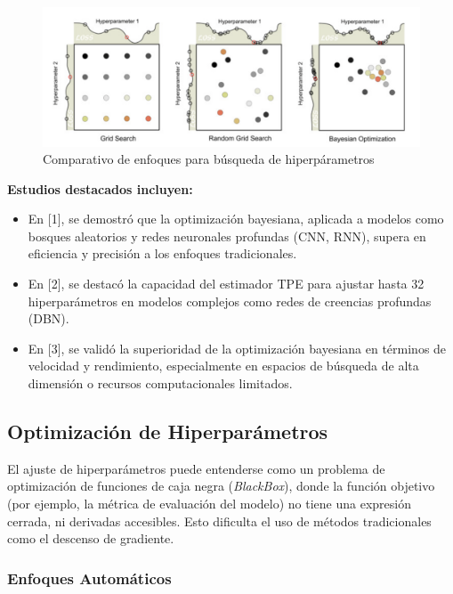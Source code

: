 \documentclass[
  12pt,
  letterpaper,
  DIV=11,
  numbers=noendperiod]{scrartcl}
\providecommand{\tightlist}{%
  \setlength{\itemsep}{0pt}\setlength{\parskip}{0pt}}\usepackage{longtable,booktabs,array}
\begin{document}
\begin{figure}[H]

{\centering \includegraphics{imgs/Comparacion_Search.png}

}

\caption{Comparativo de enfoques para búsqueda de hiperpárametros}

\end{figure}%

\textbf{Estudios destacados incluyen:}

\begin{itemize}
\tightlist
\item
  En {[}1{]}, se demostró que la optimización bayesiana, aplicada a
  modelos como bosques aleatorios y redes neuronales profundas (CNN,
  RNN), supera en eficiencia y precisión a los enfoques tradicionales.
\item
  En {[}2{]}, se destacó la capacidad del estimador TPE para ajustar
  hasta 32 hiperparámetros en modelos complejos como redes de creencias
  profundas (DBN).
\item
  En {[}3{]}, se validó la superioridad de la optimización bayesiana en
  términos de velocidad y rendimiento, especialmente en espacios de
  búsqueda de alta dimensión o recursos computacionales limitados.
\end{itemize}

\subsection{Optimización de
Hiperparámetros}\label{optimizaciuxf3n-de-hiperparuxe1metros}

El ajuste de hiperparámetros puede entenderse como un problema de
optimización de funciones de caja negra (\emph{BlackBox}), donde la
función objetivo (por ejemplo, la métrica de evaluación del modelo) no
tiene una expresión cerrada, ni derivadas accesibles. Esto dificulta el
uso de métodos tradicionales como el descenso de gradiente.

\subsubsection{Enfoques Automáticos}\label{enfoques-automuxe1ticos}
\end{document}
